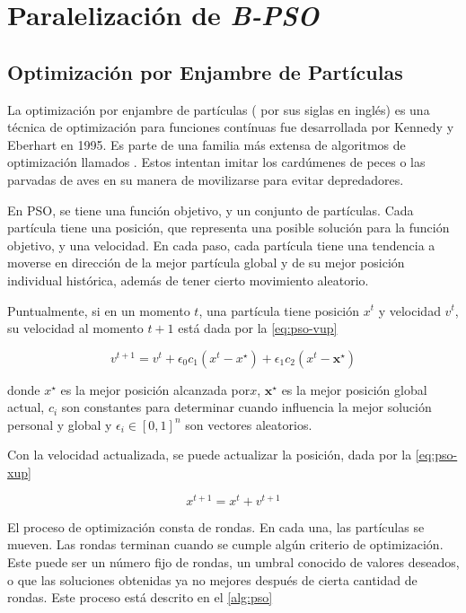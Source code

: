 \chapter{Paralelización de \emph{B-PSO}}\label{cap:bpso}

\section{Optimización por Enjambre de Partículas}\label{sec:pso}

La optimización por enjambre de partículas ( por sus siglas en inglés)
es una técnica de optimización para funciones contínuas fue
desarrollada por Kennedy y Eberhart en 1995\cite{YANG201499}. Es parte de una
familia más extensa de algoritmos de optimización llamados
. Estos intentan imitar los cardúmenes de peces o
las parvadas de aves en su manera de movilizarse para evitar depredadores.

En PSO, se tiene una función objetivo, y un conjunto de partículas. Cada
partícula tiene una posición, que representa una posible solución para la
función objetivo, y una velocidad. En cada paso, cada partícula tiene una
tendencia a moverse en dirección de la mejor partícula global y de su mejor
posición individual histórica, además de tener cierto movimiento aleatorio.

Puntualmente, si en un momento $t$, una partícula tiene posición $x^{t}$ y
velocidad $v^{t}$, su velocidad al momento $t+1$ está dada por la
\cref{eq:pso-vup}

\begin{equation}\label{eq:pso-vup}
  v^{t+1} = v^{t} + \epsilon_{0} c_{1} (x^{t} - x^{\star})
  + \epsilon_{1}c_{2} (x^{t} - \mathbf{x}^{\star})
\end{equation}

donde $x^{\star}$ es la mejor posición alcanzada por$x$, $\mathbf{x}^{\star}$ es
la mejor posición global actual, $c_{i}$ son constantes para determinar cuando
influencia la mejor solución personal y global y $\epsilon_{i} \in {[0, 1]}^{n}$
son vectores aleatorios.

Con la velocidad actualizada, se puede actualizar la posición, dada por la
\cref{eq:pso-xup}

\begin{equation}\label{eq:pso-xup}
  x^{t+1} = x^{t} + v^{t+1}
\end{equation}

El proceso de optimización consta de rondas. En cada una, las partículas se
mueven. Las rondas terminan cuando se cumple algún criterio de optimización.
Este puede ser un número fijo de rondas, un umbral conocido de valores deseados,
o que las soluciones obtenidas ya no mejores después de cierta cantidad de
rondas. Este proceso está descrito en el \cref{alg:pso}

